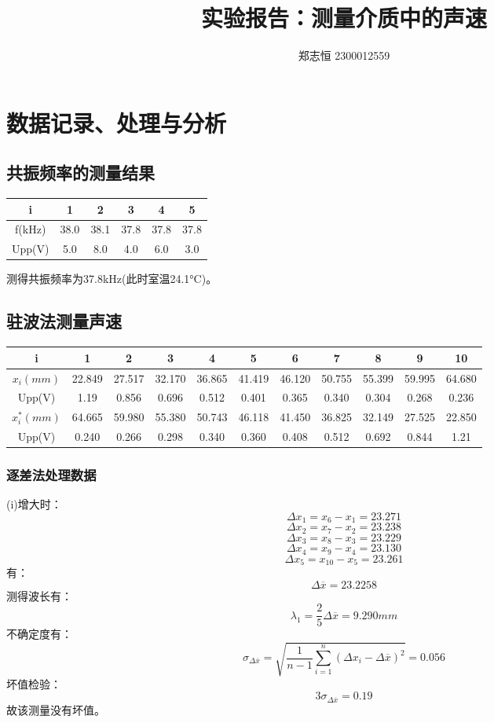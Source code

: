 \documentclass[a4paper, 10pt]{article}
\begin{document}
  \title{\textbf{实验报告：测量介质中的声速}}
  \author{郑志恒 2300012559}
  \maketitle
\section{数据记录、处理与分析}
\subsection{共振频率的测量结果}
\vspace{10pt}
\begin{center}
\begin{tabular}{|c|c|c|c|c|c|}
    \hline
    i&1&2&3&4&5\\
    \hline
    f(kHz)&38.0&38.1&37.8&37.8&37.8\\
    \hline
    Upp(V)&5.0&8.0&4.0&6.0&3.0\\
    \hline
\end{tabular}
\end{center}
\vspace{10pt}

\noindent 测得共振频率为37.8kHz(此时室温24.1°C)。

\subsection{驻波法测量声速}
\begin{center}
    \begin{tabular}{|c|c|c|c|c|c|c|c|c|c|c|}
        \hline
        i&1&2&3&4&5&6&7&8&9&10\\
        \hline
        $x_i(mm)$&22.849&27.517&32.170&36.865&41.419&46.120&50.755&55.399&59.995&64.680\\
        \hline
        Upp(V)&1.19&0.856&0.696&0.512&0.401&0.365&0.340&0.304&0.268&0.236\\
        \hline
        $x_i^*(mm)$&64.665&59.980&55.380&50.743&46.118&41.450&36.825&32.149&27.525&22.850\\
        \hline
        Upp(V)&0.240&0.266&0.298&0.340&0.360&0.408&0.512&0.692&0.844&1.21\\
        \hline
    \end{tabular}
    \end{center}

\subsubsection{逐差法处理数据}
\noindent (i)增大时：
$$\Delta x_1=x_6-x_1=23.271$$
$$\Delta x_2=x_7-x_2=23.238$$
$$\Delta x_3=x_8-x_3=23.229$$
$$\Delta x_4=x_9-x_4=23.130$$
$$\Delta x_5=x_{10}-x_5=23.261$$
有：
$$\Delta \overline{x}=23.2258$$
测得波长有：
$$\lambda_1=\frac{2}{5}\Delta \overline{x}=9.290mm$$
不确定度有：
$$\sigma_{\Delta \overline{x}}=\sqrt{\frac{1}{n-1}\sum_{i=1}^n(\Delta x_i-\Delta \overline{x})^2}=0.056$$
坏值检验：
$$3\sigma_{\Delta \overline{x}}=0.19$$
故该测量没有坏值。
\end{document}
